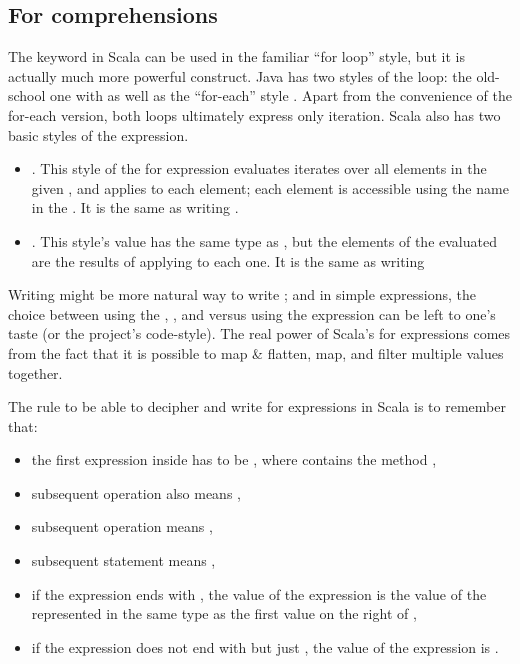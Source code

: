 \documentclass[10 pt]{article}
\begin{document}
\subsection{For comprehensions}
The  keyword in Scala can be used in the familiar ``for loop'' style, but it is actually much more powerful construct. Java has two styles of the  loop: the old-school one with  as well as the ``for-each'' style . Apart from the convenience of the for-each version, both loops ultimately express only iteration. Scala also has two basic styles of the  expression.

\begin{itemize}
  \item {}. This style of the for expression evaluates iterates over all elements in the given , and applies  to each element; each element is accessible using the name  in the . It is the same as writing .
  \item {}. This style's value has the same type as , but the elements of the evaluated  are the results of applying  to each one. It is the same as writing 
\end{itemize}

Writing  might be more natural way to write ; and in simple expressions, the choice between using the , , and  versus using the  expression can be left to one's taste (or the project's code-style). The real power of Scala's for expressions comes from the fact that it is possible to map \& flatten, map, and filter multiple values together. 

The rule to be able to decipher and write for expressions in Scala is to remember that:

\begin{itemize}
  \item the first expression inside  has to be , where  contains the method ,
  \item subsequent \pcode{<-} operation also means ,
  \item subsequent \pcode{=} operation means ,
  \item subsequent  statement means ,
  \item if the expression ends with , the value of the  expression is the value of the represented in the same type as the first value on the right of \pcode{<-},
  \item if the expression does not end with  but just , the value of the  expression is .
\end{itemize}
\end{document}
